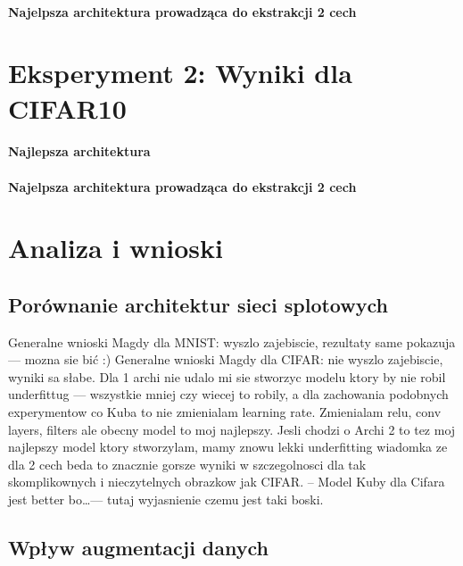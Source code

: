 \documentclass[10pt]{article}
\begin{document}
\paragraph{Najelpsza architektura prowadząca do ekstrakcji 2 cech}

\pagebreak
\section{Eksperyment 2: Wyniki dla CIFAR10}\label{sec:ex2_cifar}

\paragraph{Najlepsza architektura}
\paragraph{Najelpsza architektura prowadząca do ekstrakcji 2 cech}

\pagebreak
\section{Analiza i wnioski}\label{sec:wyniki}
\subsection*{Porównanie architektur sieci splotowych}
Generalne wnioski Magdy dla MNIST\@: wyszlo zajebiscie, rezultaty same pokazuja --- mozna sie bić :)
Generalne wnioski Magdy dla CIFAR\@: nie wyszlo zajebiscie, wyniki sa słabe. Dla 1 archi nie udalo mi sie stworzyc modelu ktory by nie robil underfittug --- wszystkie mniej czy wiecej to robily, a dla zachowania podobnych experymentow co Kuba to nie zmienialam learning rate. Zmienialam relu, conv layers, filters ale obecny model to moj najlepszy.
Jesli chodzi o Archi 2 to tez moj najlepszy model ktory stworzylam, mamy znowu lekki underfitting
wiadomka ze dla 2 cech beda to znacznie gorsze wyniki w szczegolnosci dla tak skomplikownych i nieczytelnych obrazkow jak CIFAR.
--
Model Kuby dla Cifara jest better bo\ldots --- tutaj wyjasnienie czemu jest taki boski.
\subsection*{Wpływ augmentacji danych}
\end{document}
